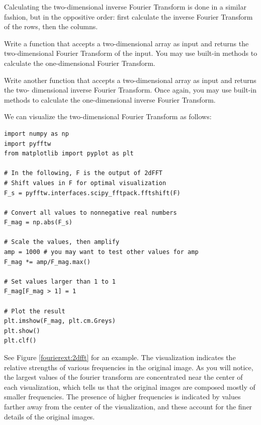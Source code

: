 Calculating the two-dimensional inverse Fourier Transform is done in a similar fashion, but in the
oppositive order: first calculate the inverse Fourier Transform of the rows, then the columns.

\begin{problem}
Write a function  that accepts a two-dimensional array as input and returns the two-dimensional
Fourier Transform of the input. You may use built-in methods to calculate the one-dimensional Fourier
Transform.

Write another function  that accepts a two-dimensional array as input and returns the two-
dimensional inverse Fourier Transform. Once again,  you may use built-in methods to calculate the
one-dimensional inverse Fourier Transform.
\end{problem}

We can visualize the two-dimensional Fourier Transform as follows:
\begin{lstlisting}
import numpy as np
import pyfftw
from matplotlib import pyplot as plt

# In the following, F is the output of 2dFFT
# Shift values in F for optimal visualization
F_s = pyfftw.interfaces.scipy_fftpack.fftshift(F)

# Convert all values to nonnegative real numbers
F_mag = np.abs(F_s)

# Scale the values, then amplify
amp = 1000 # you may want to test other values for amp
F_mag *= amp/F_mag.max()

# Set values larger than 1 to 1
F_mag[F_mag > 1] = 1

# Plot the result
plt.imshow(F_mag, plt.cm.Greys)
plt.show()
plt.clf()
\end{lstlisting}
See Figure \ref{fourierext:2dfft} for an example. The visualization indicates
the relative strengths of various frequencies in the original image.
As you will notice, the largest values of the fourier transform are concentrated
near the center of each visualization, which tells us that the original images are
composed mostly of smaller frequencies. The presence of higher frequencies is indicated
by values farther away from the center of the visualization, and these account for the
finer details of the original images.

